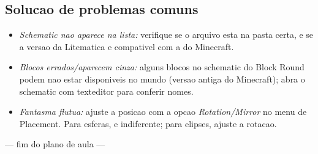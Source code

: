 \documentclass[12pt,a4paper]{scrartcl}
\begin{document}
\subsection{Solucao de problemas comuns}
\begin{itemize}[leftmargin=1.3em,itemsep=0.15em,topsep=0.3em,nosep]
  \item \emph{Schematic nao aparece na lista:} verifique se o arquivo esta na pasta certa, e se a versao da Litematica e compativel com a do Minecraft.
  \item \emph{Blocos errados/aparecem cinza:} alguns blocos no schematic do Block Round podem nao estar disponiveis no mundo (versao antiga do Minecraft); abra o schematic com texteditor para conferir nomes.
  \item \emph{Fantasma flutua:} ajuste a posicao com a opcao \emph{Rotation/Mirror} no menu de Placement. Para esferas, e indiferente; para elipses, ajuste a rotacao.
\end{itemize}

\vspace{2em}
\begin{center}
\color{muted}\small\sffamily
--- fim do plano de aula ---
\end{center}
\end{document}
